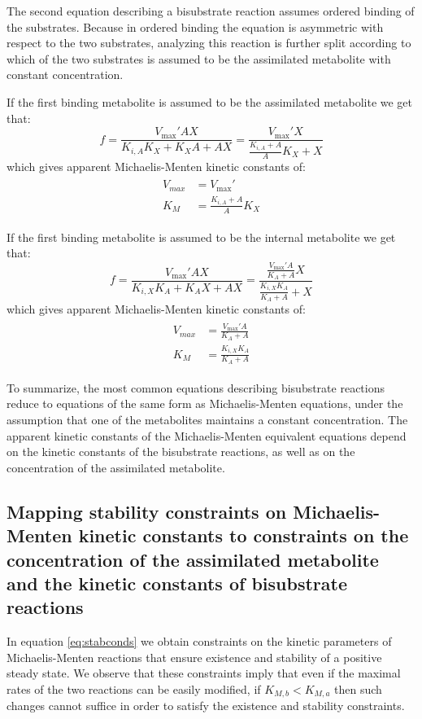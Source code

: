   The second equation describing a bisubstrate reaction assumes ordered binding of the substrates.
  Because in ordered binding the equation is asymmetric with respect to the two substrates, analyzing this reaction is further split according to which of the two substrates is assumed to be the assimilated metabolite with constant concentration.

  If the first binding metabolite is assumed to be the assimilated metabolite we get that:
  \begin{equation*}
      f=\frac{V_{\max}'AX}{K_{i,A}K_X+K_XA+AX}=\frac{V_{\max}'X}{\frac{K_{i,A}+A}{A}K_X+X}
  \end{equation*}
  which gives apparent Michaelis-Menten kinetic constants of:
  \begin{align}
  \begin{split}
      \label{eq:paramsasymfst}
      V_{max}&=V_{\max}' \\
      K_M&=\frac{K_{i,A}+A}{A}K_X
  \end{split}
  \end{align}
  
  If the first binding metabolite is assumed to be the internal metabolite we get that:
  \begin{equation*}
      f=\frac{V_{\max}'AX}{K_{i,X}K_A+K_AX+AX}=\frac{\frac{V_{\max}'A}{K_A+A}X}{\frac{K_{i,X}K_A}{K_A+A}+X}
  \end{equation*}
  which gives apparent Michaelis-Menten kinetic constants of:
  \begin{align}
  \begin{split}
      \label{eq:paramsasymsnd}
      V_{max}&=\frac{V_{\max}'A}{K_A+A} \\
      K_M&=\frac{K_{i,X}K_A}{K_A+A}
  \end{split}
  \end{align}

  To summarize, the most common equations describing bisubstrate reactions reduce to equations of the same form as Michaelis-Menten equations, under the assumption that one of the metabolites maintains a constant concentration.
  The apparent kinetic constants of the Michaelis-Menten equivalent equations depend on the kinetic constants of the bisubstrate reactions, as well as on the concentration of the assimilated metabolite.


  \subsection{Mapping stability constraints on Michaelis-Menten kinetic constants to constraints on the concentration of the assimilated metabolite and the kinetic constants of bisubstrate reactions}
  In equation \ref{eq:stabconds} we obtain constraints on the kinetic parameters of Michaelis-Menten reactions that ensure existence and stability of a positive steady state.
  We observe that these constraints imply that even if the maximal rates of the two reactions can be easily modified, if $K_{M,b}<K_{M,a}$ then such changes cannot suffice in order to satisfy the existence and stability constraints.
  

